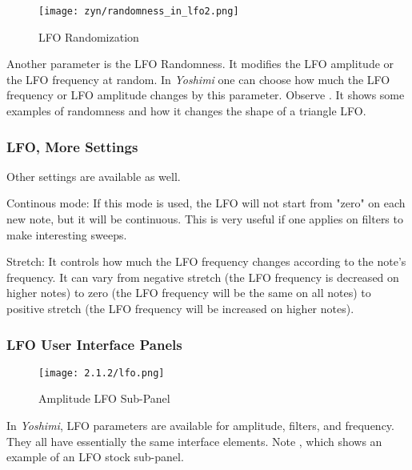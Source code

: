 \begin{figure}[H]
   \centering
   \texttt{[image: zyn/randomness\_in\_lfo2.png]}
   \caption[LFO Randomization]{LFO Randomization}
   \label{fig:randomness_in_lfo}
\end{figure}

   Another parameter is the LFO Randomness. It modifies the LFO amplitude or
   the LFO frequency at random. In \textsl{Yoshimi}
   one can choose how much the LFO
   frequency or LFO amplitude changes by this parameter.
   Observe .
   It shows some examples of randomness and how it changes the shape of a
   triangle LFO.

\subsubsection{LFO, More Settings}
\label{subsubsec:lfo_more_settings}

   Other settings are available as well.

   Continous mode: If this mode is used, the LFO will not start from "zero" on
   each new note, but it will be continuous. This is very useful if one
   applies on filters to make interesting sweeps.

   Stretch: It controls how much the LFO frequency changes according to the
   note’s frequency. It can vary from negative stretch (the LFO frequency is
   decreased on higher notes) to zero (the LFO frequency will be the same
   on all notes) to positive stretch (the LFO frequency will be
   increased on higher notes).

\subsubsection{LFO User Interface Panels}
\label{subsubsec:lfo_user_interface_panels}

   \setcounter{ItemCounter}{0}      %

\begin{figure}[H]
   \centering
   \texttt{[image: 2.1.2/lfo.png]}
   \caption[Amplitude LFO Sub-Panel]{Amplitude LFO Sub-Panel}
   \label{fig:amplitude_lfo}
\end{figure}

   In \textsl{Yoshimi}, LFO parameters are available for amplitude, filters,
   and frequency.  They all have essentially the same interface elements.
   Note , which
   shows an example of an LFO stock sub-panel.

